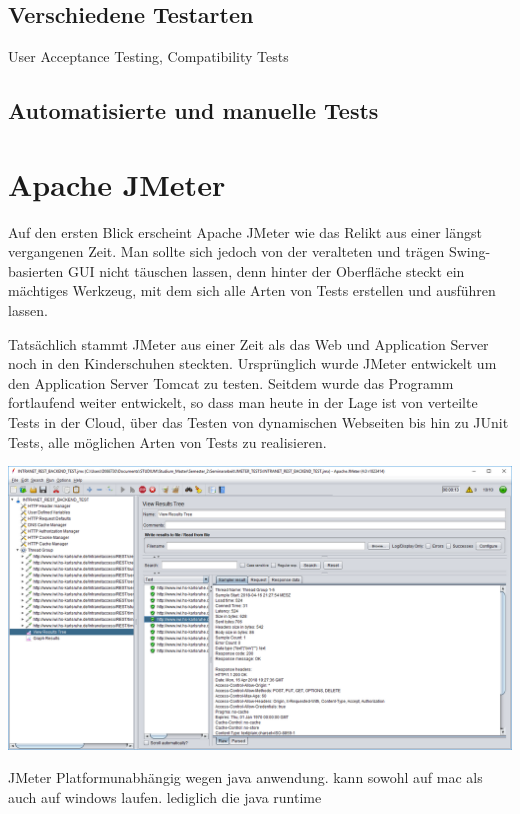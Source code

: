 \documentclass[a4paper,12pt]{article}
\begin{document}
\subsection{Verschiedene Testarten}
User Acceptance Testing, Compatibility Tests
\subsection{Automatisierte und manuelle Tests}


\section{Apache JMeter}
Auf den ersten Blick erscheint Apache JMeter wie das Relikt aus einer längst vergangenen Zeit. Man sollte sich jedoch von der veralteten und trägen Swing-basierten GUI nicht täuschen lassen, denn hinter der Oberfläche steckt ein mächtiges Werkzeug, mit dem sich alle Arten von Tests erstellen und ausführen lassen. \cite{online:heiseJMeterOderGatling}\par
Tatsächlich stammt JMeter aus einer Zeit als das Web und Application Server noch in den Kinderschuhen steckten. Ursprünglich wurde JMeter entwickelt um den Application Server Tomcat zu testen. Seitdem wurde das Programm fortlaufend weiter entwickelt, so dass man heute in der Lage ist von verteilte Tests in der Cloud, über das Testen von dynamischen Webseiten bis hin zu JUnit Tests, alle möglichen Arten von Tests zu realisieren. \cite{online:ApacheJMeter}

 
\includegraphics[width=1\textwidth]{bilder/jmeter_1.png}\par\vspace{1cm}
JMeter Platformunabhängig wegen java anwendung. kann sowohl auf mac als auch auf windows laufen. lediglich die java runtime
\end{document}
